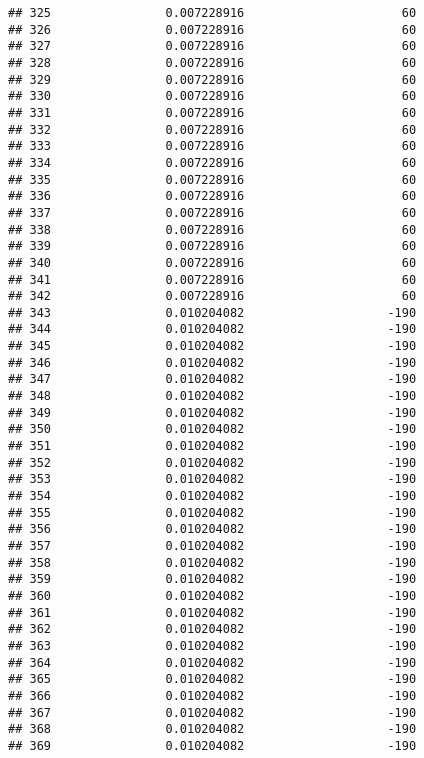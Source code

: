 \documentclass[]{article}
\begin{document}
\begin{verbatim}
## 325                0.007228916                      60
## 326                0.007228916                      60
## 327                0.007228916                      60
## 328                0.007228916                      60
## 329                0.007228916                      60
## 330                0.007228916                      60
## 331                0.007228916                      60
## 332                0.007228916                      60
## 333                0.007228916                      60
## 334                0.007228916                      60
## 335                0.007228916                      60
## 336                0.007228916                      60
## 337                0.007228916                      60
## 338                0.007228916                      60
## 339                0.007228916                      60
## 340                0.007228916                      60
## 341                0.007228916                      60
## 342                0.007228916                      60
## 343                0.010204082                    -190
## 344                0.010204082                    -190
## 345                0.010204082                    -190
## 346                0.010204082                    -190
## 347                0.010204082                    -190
## 348                0.010204082                    -190
## 349                0.010204082                    -190
## 350                0.010204082                    -190
## 351                0.010204082                    -190
## 352                0.010204082                    -190
## 353                0.010204082                    -190
## 354                0.010204082                    -190
## 355                0.010204082                    -190
## 356                0.010204082                    -190
## 357                0.010204082                    -190
## 358                0.010204082                    -190
## 359                0.010204082                    -190
## 360                0.010204082                    -190
## 361                0.010204082                    -190
## 362                0.010204082                    -190
## 363                0.010204082                    -190
## 364                0.010204082                    -190
## 365                0.010204082                    -190
## 366                0.010204082                    -190
## 367                0.010204082                    -190
## 368                0.010204082                    -190
## 369                0.010204082                    -190

\end{verbatim}
\end{document}
